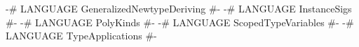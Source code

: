 \begin{code}
{-# LANGUAGE GeneralizedNewtypeDeriving #-}
{-# LANGUAGE InstanceSigs               #-}
{-# LANGUAGE PolyKinds                  #-}
{-# LANGUAGE ScopedTypeVariables        #-}
{-# LANGUAGE TypeApplications           #-}
\end{code}
